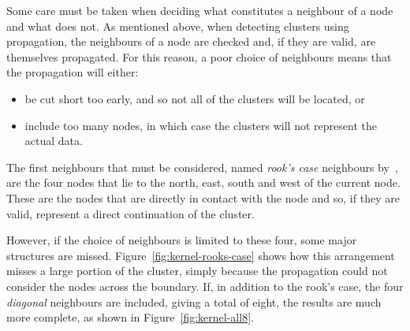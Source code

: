 Some care must be taken when deciding what constitutes a neighbour of a node
and what does not. As mentioned above, when detecting clusters using
propagation, the neighbours of a node are checked and, if they are valid, are
themselves propagated. For this reason, a poor choice of neighbours means that
the propagation will either:

\begin{itemize}
	\item be cut short too early, and so not all of the clusters will be
		located, or
	\item include too many nodes, in which case the clusters will not represent
		the actual data.
\end{itemize}

The first neighbours that must be considered, named \emph{rook's case}
neighbours by~\citet{abel1990comparative}, are the four nodes that lie to the
north, east, south and west of the current node. These are the nodes that are
directly in contact with the node and so, if they are valid, represent a direct
continuation of the cluster.

However, if the choice of neighbours is limited to these four, some major
structures are missed. Figure~\ref{fig:kernel-rooks-case} shows how this
arrangement misses a large portion of the cluster, simply because the
propagation could not consider the nodes across the boundary. If, in addition
to the rook's case, the four \emph{diagonal} neighbours are included, giving a
total of eight, the results are much more complete, as shown in
Figure~\ref{fig:kernel-all8}.

